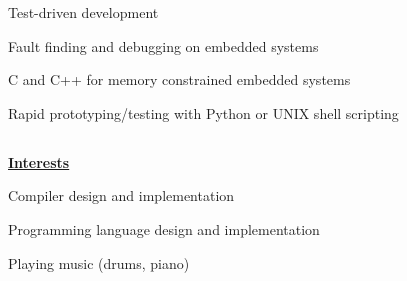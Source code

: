 \documentclass[6pt]{article}
\begin{document}
\begin{minipage}{15em}
\noindent
\begin{itemize}
{\small \raggedright
    \item Test-driven development
    \item Fault finding and debugging on embedded systems
    \item C and C++ for memory constrained embedded systems
    \item Rapid prototyping/testing with Python or UNIX shell scripting
}
\end{itemize}

\subsection*{}
{\underline{\textbf{Interests}}}

\noindent
\begin{itemize}
{\small \raggedright
    \item Compiler design and implementation
    \item Programming language design and implementation
    \item Playing music (drums, piano)
}
\end{itemize}
\end{minipage}
%
%
\end{document}
